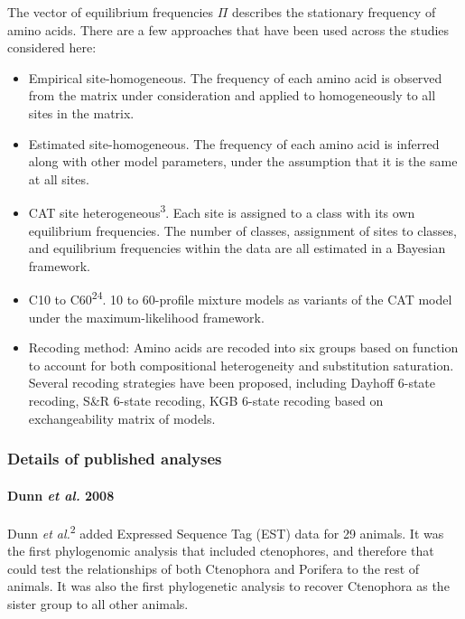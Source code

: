 \documentclass[]{article}
\let\oldparagraph\paragraph
\renewcommand{\paragraph}[1]{\oldparagraph{#1}\mbox{}}
\begin{document}
The vector of equilibrium frequencies \(\Pi\) describes the stationary
frequency of amino acids. There are a few approaches that have been used
across the studies considered here:

\begin{itemize}
\item
  Empirical site-homogeneous. The frequency of each amino acid is
  observed from the matrix under consideration and applied to
  homogeneously to all sites in the matrix.
\item
  Estimated site-homogeneous. The frequency of each amino acid is
  inferred along with other model parameters, under the assumption that
  it is the same at all sites.
\item
  CAT site heterogeneous\textsuperscript{3}. Each site is assigned to a
  class with its own equilibrium frequencies. The number of classes,
  assignment of sites to classes, and equilibrium frequencies within the
  data are all estimated in a Bayesian framework.
\item
  C10 to C60\textsuperscript{24}. 10 to 60-profile mixture models as
  variants of the CAT model under the maximum-likelihood framework.
\item
  Recoding method: Amino acids are recoded into six groups based on
  function to account for both compositional heterogeneity and
  substitution saturation. Several recoding strategies have been
  proposed, including Dayhoff 6-state recoding, S\&R 6-state recoding,
  KGB 6-state recoding based on exchangeability matrix of models.
\end{itemize}

\hypertarget{details-of-published-analyses}{%
\subsubsection{Details of published
analyses}\label{details-of-published-analyses}}

\hypertarget{dunn-et-al.-2008}{%
\paragraph{\texorpdfstring{Dunn \emph{et al.}
2008}{Dunn et al. 2008}}\label{dunn-et-al.-2008}}

Dunn \emph{et al.}\textsuperscript{2} added Expressed Sequence Tag (EST)
data for 29 animals. It was the first phylogenomic analysis that
included ctenophores, and therefore that could test the relationships of
both Ctenophora and Porifera to the rest of animals. It was also the
first phylogenetic analysis to recover Ctenophora as the sister group to
all other animals.
\end{document}
